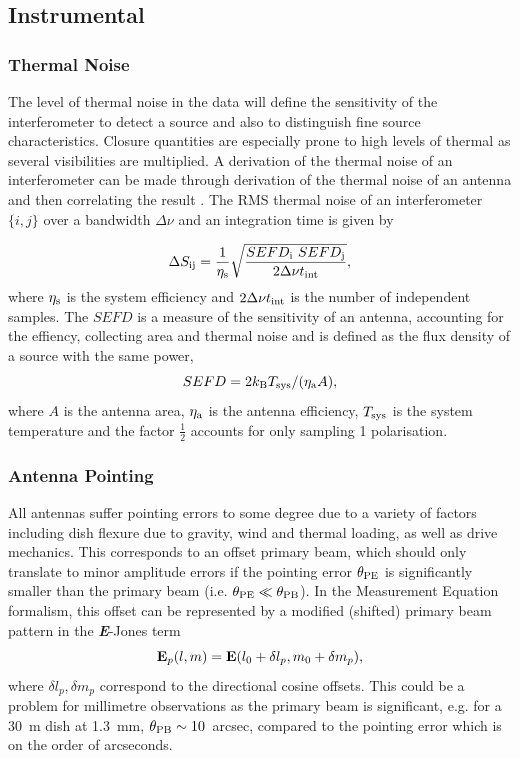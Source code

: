 \subsection{Instrumental}

\subsubsection{Thermal Noise}

The  level of thermal noise in the data will define the sensitivity of the interferometer to detect a source and also to distinguish fine source characteristics. Closure quantities are especially prone to high levels of thermal as several visibilities are multiplied. A derivation of the thermal noise of an interferometer can be made through derivation of the thermal noise of an antenna and then correlating the result \citep*{Wrobel_1999}. The RMS thermal noise of an interferometer $\{i,j\}$ over a bandwidth $\Delta \nu$ and an integration time is given by 

\begin{equation}
 \Delta S_{\rm ij} = \frac{1}{\eta_{\rm s}}\sqrt{\frac{SEFD_{\rm i}\ SEFD_{\rm j}}{2 \Delta \nu t_{\rm int}}},  
\end{equation}
where $\eta_{\rm s}$ is the system efficiency and $2 \Delta \nu t_{\rm int}$ is the number of independent samples. The $SEFD$ is a measure of the sensitivity of an antenna, accounting for the effiency, collecting area and thermal noise and is defined as the flux density of a source with the same power,
\begin{equation}
 SEFD = 2 k_{\rm B} T_{\rm sys} / (\eta_{\rm a} A),
\end{equation}
where $A$ is the antenna area, $\eta_{\rm a}$ is the antenna efficiency, $T_{\rm sys}$ is the system temperature and the factor $\frac{1}{2}$ accounts for only sampling 1 polarisation.


\subsubsection{Antenna Pointing}
All antennas suffer pointing errors to some degree due to a variety of factors including dish flexure due to gravity, wind and thermal loading, as well as drive mechanics. This corresponds to an offset primary beam, which should only translate to minor amplitude errors if the pointing error $\theta_{\rm PE}$ is significantly smaller than the primary beam (i.e. $\theta_{\rm PE} \ll \theta_{\rm PB}$). In the Measurement Equation formalism, this offset can be represented by a modified (shifted) primary beam pattern in the {\bf \it E}-Jones term 
\begin{equation}
{\bf E}_p(l,m) = {\bf E}(l_0 + \delta l_p, m_0 + \delta m_p),
\end{equation}
where $\delta l_p, \delta m_p$ correspond to the directional cosine offsets.
This could be a problem for millimetre observations as the primary beam is significant, e.g. for a 30~m dish at 1.3~mm, $\theta_{\rm PB} \sim 10$~arcsec, compared to the pointing error which is on the order of arcseconds.

